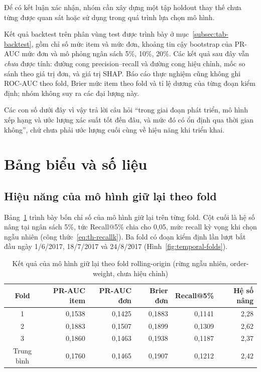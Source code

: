 \documentclass[12pt,a4paper]{report}
\begin{document}
Để có kết luận xác nhận, nhóm cần xây dựng một tập holdout thay thế chưa từng được quan sát hoặc sử dụng trong quá trình lựa chọn mô hình. 

Kết quả backtest trên phân vùng test được trình bày ở mục~\ref{subsec:tab-backtest}, gồm chỉ số mức item và mức đơn, khoảng tin cậy bootstrap của PR-AUC mức đơn và mô phỏng ngân sách 5\%, 10\%, 20\%. Các kết quả sau đây vẫn \emph{chưa} được tính: đường cong precision--recall và đường cong hiệu chỉnh, mốc so sánh theo giá trị đơn, và giá trị SHAP. Báo cáo thực nghiệm cũng không ghi ROC-AUC theo fold, Brier mức item theo fold và tỉ lệ dương của từng đoạn kiểm định; nhóm không suy ra các đại lượng này.

Các con số dưới đây vì vậy trả lời câu hỏi ``trong giai đoạn phát triển, mô hình xếp hạng và ước lượng xác suất tốt đến đâu, và mức đó có ổn định qua thời gian không'', chứ chưa phải ước lượng cuối cùng về hiệu năng khi triển khai.

\section{Bảng biểu và số liệu}\label{sec:tables}

\subsection{Hiệu năng của mô hình giữ lại theo fold}\label{subsec:tab-folds}

Bảng~\ref{tab:res-folds} trình bày bốn chỉ số của mô hình giữ lại trên từng fold. Cột cuối là hệ số nâng tại ngân sách 5\%, tức Recall@5\% chia cho 0,05, mức recall kỳ vọng khi chọn ngẫu nhiên (công thức~\eqref{eq:th-recallk}). Ba fold có đoạn kiểm định lần lượt bắt đầu ngày 1/6/2017, 18/7/2017 và 24/8/2017 (Hình~\ref{fig:temporal-folds}).

\begin{table}[htbp]\centering\small
\caption{Kết quả của mô hình giữ lại theo fold rolling-origin (rừng ngẫu nhiên, order-weight, chưa hiệu chỉnh)}\label{tab:res-folds}
\begin{tabular}{crrrrr}
\toprule
Fold & PR-AUC item & PR-AUC đơn & Brier đơn & Recall@5\% & Hệ số nâng \\
\midrule
1 & 0,1538 & 0,1425 & 0,1883 & 0,1141 & 2,28 \\
2 & 0,1883 & 0,1507 & 0,1899 & 0,1309 & 2,62 \\
3 & 0,1860 & 0,1463 & 0,1938 & 0,1187 & 2,37 \\
\midrule
Trung bình & 0,1760 & 0,1465 & 0,1907 & 0,1212 & 2,42 \\
\bottomrule
\end{tabular}
\end{table}
\end{document}

